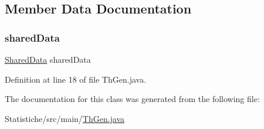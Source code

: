 \subsection{Member Data Documentation}
\mbox{\label{classmain_1_1_th_gen_a1cc1b8edddc4a6929213d3387b370bcd}} 
\subsubsection{\texorpdfstring{shared\+Data}{sharedData}}
{\footnotesize\ttfamily \mbox{\hyperlink{classmain_1_1_shared_data}{Shared\+Data}} shared\+Data\hspace{0.3cm}{\ttfamily [private]}}



Definition at line 18 of file Th\+Gen.\+java.



The documentation for this class was generated from the following file\+:\begin{DoxyCompactItemize}
\item 
Statistiche/src/main/\mbox{\hyperlink{_th_gen_8java}{Th\+Gen.\+java}}\end{DoxyCompactItemize}

